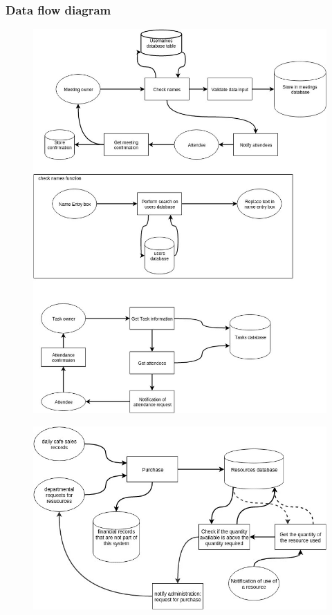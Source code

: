 \subsubsection{Data flow diagram}

\begin{figure}[H]
	\includegraphics[width=\textwidth]{./Analysis/diagrams/dfp1.jpg}
\end{figure}
\begin{figure}[H]
	\includegraphics[width=\textwidth]{./Analysis/diagrams/dfp2.jpg}
\end{figure}

